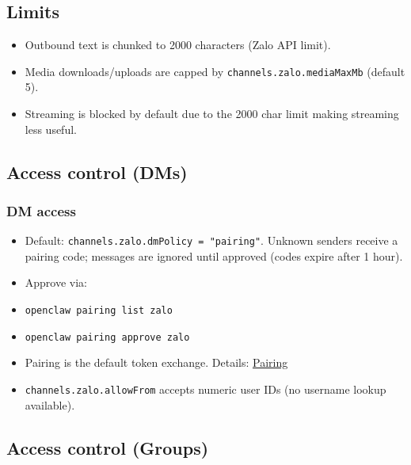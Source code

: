 \subsection{Limits}


\begin{itemize}
  \item Outbound text is chunked to 2000 characters (Zalo API limit).
  \item Media downloads/uploads are capped by \texttt{channels.zalo.mediaMaxMb} (default 5).
  \item Streaming is blocked by default due to the 2000 char limit making streaming less useful.
\end{itemize}


\subsection{Access control (DMs)}


\subsubsection{DM access}


\begin{itemize}
  \item Default: \texttt{channels.zalo.dmPolicy = "pairing"}. Unknown senders receive a pairing code; messages are ignored until approved (codes expire after 1 hour).
  \item Approve via:
  \item \texttt{openclaw pairing list zalo}
  \item \texttt{openclaw pairing approve zalo }
  \item Pairing is the default token exchange. Details: \href{/channels/pairing}{Pairing}
  \item \texttt{channels.zalo.allowFrom} accepts numeric user IDs (no username lookup available).
\end{itemize}


\subsection{Access control (Groups)}


